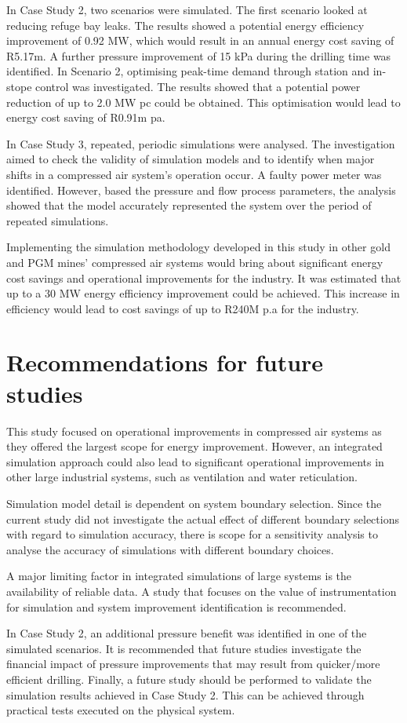 	 \par
	 In Case Study 2, two scenarios were simulated. The first scenario looked at reducing refuge bay leaks. The results showed a potential energy efficiency improvement of 0.92 MW, which would result in an annual energy cost saving of R5.17m. A further pressure improvement of 15 kPa during the drilling time was identified. In Scenario 2, optimising peak-time demand through station and in-stope control was investigated. The results showed that a potential power reduction of up to 2.0 MW \gls{pc} could be obtained. This optimisation would lead to energy cost saving of R0.91m \gls{pa}.
	 \par 
	 In Case Study 3, repeated, periodic simulations were analysed. The investigation aimed to check the validity of simulation models and to identify when major shifts in a compressed air system’s operation occur. A faulty power meter was identified. However, based the pressure and flow process parameters, the analysis showed that the model accurately represented the system over the period of repeated simulations.
	 \par
	 Implementing the simulation methodology developed in this study in other gold and PGM mines' compressed air systems would  bring about significant energy cost savings and operational improvements for the industry. It was estimated that up to a 30 MW energy efficiency improvement could be achieved. This increase in efficiency would lead to cost savings of up to R240M p.a for the industry. 
	 \section{Recommendations for future studies}
	 This study focused on operational improvements in compressed air systems as they offered the largest scope for energy improvement. However, an integrated simulation approach could also lead to significant operational improvements in other large industrial systems, such as ventilation and water reticulation.
	 \par
	 \clearpage
	 Simulation model detail is dependent on system boundary selection. Since the current study did not investigate the actual effect of different boundary selections with regard to simulation accuracy, there is scope for a sensitivity analysis to analyse the accuracy of simulations with different boundary choices.
	 \par
	 A major limiting factor in integrated simulations of large systems is the availability of reliable data. A study that focuses on the value of instrumentation for simulation and system improvement identification is recommended.
	 \par 
	 In Case Study 2, an additional pressure benefit was identified in one of the simulated scenarios. It is recommended that future studies investigate the financial impact of pressure improvements that may result from quicker/more efficient drilling. Finally, a future study should be performed to validate the simulation results achieved in Case Study 2. This can be achieved through practical tests executed on the physical system.
